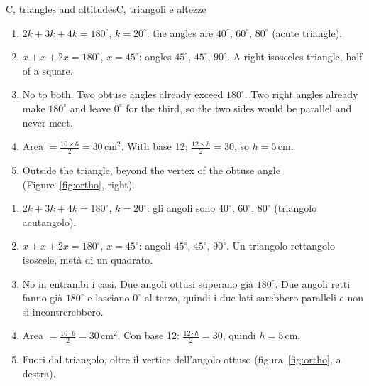 \begin{solution}{C, triangles and altitudes}{C, triangoli e altezze}
\begin{enumerate}[label=\textbf{C\arabic*.}, leftmargin=2.2em]
\item $2k + 3k + 4k = 180^\circ$, $k = 20^\circ$: the angles are $40^\circ$, $60^\circ$, $80^\circ$ (acute triangle).
\item $x + x + 2x = 180^\circ$, $x = 45^\circ$: angles $45^\circ$, $45^\circ$, $90^\circ$. A right isosceles triangle, half of a square.
\item No to both. Two obtuse angles already exceed $180^\circ$. Two right angles already make $180^\circ$ and leave $0^\circ$ for the third, so the two sides would be parallel and never meet.
\item Area $= \frac{10 \times 6}{2} = 30\,\text{cm}^2$. With base 12: $\frac{12 \times h}{2} = 30$, so $h = 5$\,cm.
\item Outside the triangle, beyond the vertex of the obtuse angle (Figure~\ref{fig:ortho}, right).
\end{enumerate}
\tcblower
\begin{enumerate}[label=\textbf{C\arabic*.}, leftmargin=2.2em]
\item $2k + 3k + 4k = 180^\circ$, $k = 20^\circ$: gli angoli sono $40^\circ$, $60^\circ$, $80^\circ$ (triangolo acutangolo).
\item $x + x + 2x = 180^\circ$, $x = 45^\circ$: angoli $45^\circ$, $45^\circ$, $90^\circ$. Un triangolo rettangolo isoscele, metà di un quadrato.
\item No in entrambi i casi. Due angoli ottusi superano già $180^\circ$. Due angoli retti fanno già $180^\circ$ e lasciano $0^\circ$ al terzo, quindi i due lati sarebbero paralleli e non si incontrerebbero.
\item Area $= \frac{10 \cdot 6}{2} = 30\,\text{cm}^2$. Con base 12: $\frac{12 \cdot h}{2} = 30$, quindi $h = 5$\,cm.
\item Fuori dal triangolo, oltre il vertice dell'angolo ottuso (figura~\ref{fig:ortho}, a destra).
\end{enumerate}
\end{solution}

